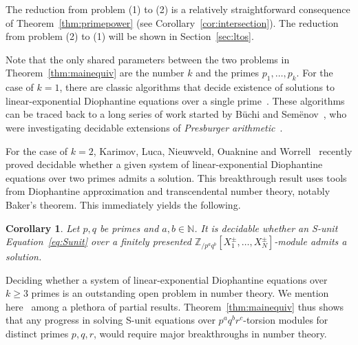 \documentclass[letterpaper, 11pt, thm-restate]{article}
\numberwithin{equation}{section}
\newcommand{\Z}{\mathbb{Z}}
\newcommand{\N}{\mathbb{N}}
\newcommand{\bb}{\boldsymbol{b}}
\newcommand{\bc}{\boldsymbol{c}}
\newcommand{\gen}[1]{\left\langle {#1} \right\rangle}
\newtheorem{cor}[thrm]{Corollary}
\theoremstyle{definition}
\theoremstyle{definition}
\theoremstyle{definition}
\newtheorem{rmk}[thrm]{Remark}
\begin{document}
The reduction from problem (1) to (2) is a relatively straightforward consequence of Theorem~\ref{thm:primepower} (see Corollary~\ref{cor:intersection}).
The reduction from problem (2) to (1) will be shown in Section~\ref{sec:ltos}.

Note that the only shared parameters between the two problems in Theorem~\ref{thm:mainequiv} are the number $k$ and the primes $p_1, \ldots, p_k$.
For the case of $k = 1$, there are classic algorithms that decide existence of solutions to linear-exponential Diophantine equations over a single prime~\cite{benedikt2023complexity}.
These algorithms can be traced back to a long series of work started by B\"{u}chi and Sem\"{e}nov~\cite{buchi1960weak, semenov1980certain}, who were investigating decidable extensions of \emph{Presburger arithmetic}~\cite{presburger1929uber}.

For the case of $k = 2$, Karimov, Luca, Nieuwveld, Ouaknine and Worrell~\cite{karimov2025decidability} recently proved decidable whether a given system of linear-exponential Diophantine equations over two primes admits a solution.
This breakthrough result uses tools from Diophantine approximation and transcendental number theory, notably Baker's theorem.
This immediately yields the following.

\begin{cor}\label{cor:twoprimes}
    Let $p, q$ be primes and $a, b \in \N$.
    It is decidable whether an S-unit Equation~\eqref{eq:Sunit} over a finitely presented $\Z_{/p^a q^b}[X_1^{\pm}, \ldots, X_N^{\pm}]$-module admits a solution.
\end{cor}

Deciding whether a system of linear-exponential Diophantine equations over $k \geq 3$ primes is an outstanding open problem in number theory.
We mention here~\cite{brenner1982exponential, alma991009821129706011, cao1999note, bajpai2023effective, berthe2024decidability} among a plethora of partial results.
Theorem~\ref{thm:mainequiv} thus shows that any progress in solving S-unit equations over $p^a q^b r^c$-torsion modules for distinct primes $p, q, r$, would require major breakthroughs in number theory.

\end{document}
